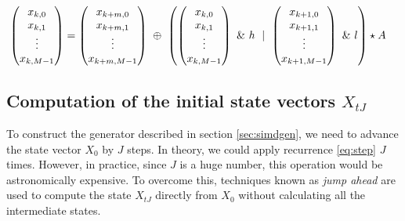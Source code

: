 \documentclass[preprint,1p,times]{elsarticle}
\begin{document}
	\begin{align}
		\label{eq:msmt19937}
		\begin{pmatrix}x_{k,0} \\ x_{k,1} \\ \vdots \\ x_{k,M-1} \end{pmatrix}
		&= \begin{pmatrix}x_{k+m, 0} \\ x_{k+m,1} \\ \vdots \\ x_{k+m,M-1} \end{pmatrix} ~\mathbin{\oplus}~ \left(\begin{pmatrix}x_{k,0} \\ x_{k,1} \\ \vdots \\ x_{k,M-1} \end{pmatrix}~\&~h ~\mid~ \begin{pmatrix}x_{k+1,0} \\ x_{k+1,1} \\ \vdots \\ x_{k+1,M-1}  \end{pmatrix}~\&~l\right) \star A
	\end{align}
	
	\subsection{Computation of the initial state vectors $X_{tJ}$}
	To construct the generator described in section \ref{sec:simdgen}, we need to advance the state vector $X_0$ by $J$ steps. In theory, we could apply recurrence \eqref{eq:step} $J$ times. However, in practice, since $J$ is a huge number, this operation would be astronomically expensive. 
	To overcome this, techniques known as \textit{jump ahead} are used to compute the state $X_{tJ}$ directly from $X_0$ without calculating all the intermediate states.
	
\end{document}
